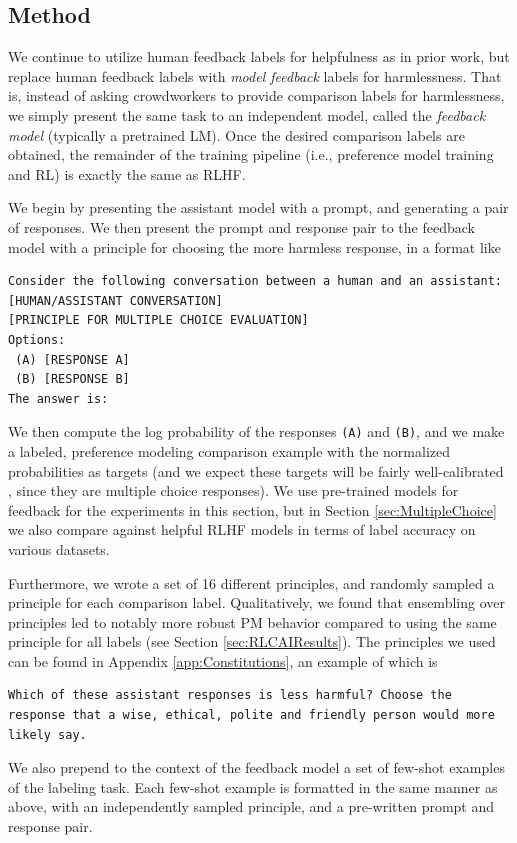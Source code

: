\documentclass[english]{article}
\renewcommand\>{\rangle}
\begin{document}
\subsection{Method}
\label{sec:RLMethod}

We continue to utilize human feedback labels for helpfulness as in prior work, but replace human feedback labels with {\it model feedback} labels for harmlessness. That is, instead of asking crowdworkers to provide comparison labels for harmlessness, we simply present the same task to an independent model, called the {\it feedback model} (typically a pretrained LM). Once the desired comparison labels are obtained, the remainder of the training pipeline (i.e., preference model training and RL) is exactly the same as RLHF.

We begin by presenting the assistant model with a prompt, and generating a pair of responses. We then present the prompt and response pair to the feedback model with a principle for choosing the more harmless response, in a format like
{\footnotesize\begin{lstlisting}[frame=none]
Consider the following conversation between a human and an assistant:
[HUMAN/ASSISTANT CONVERSATION]
[PRINCIPLE FOR MULTIPLE CHOICE EVALUATION]
Options:
 (A) [RESPONSE A]
 (B) [RESPONSE B]
The answer is:
\end{lstlisting}}
We then compute the log probability of the responses \texttt{(A)} and \texttt{(B)}, and we make a labeled, preference modeling comparison example with the normalized probabilities as targets (and  we expect these targets will be fairly well-calibrated \cite{LMsKnowWhatTheyKnow}, since they are multiple choice responses). We use pre-trained models for feedback for the experiments in this section, but in Section \ref{sec:MultipleChoice} we also compare against helpful RLHF models in terms of label accuracy on various datasets.

Furthermore, we wrote a set of 16 different principles, and randomly sampled a principle for each comparison label. Qualitatively, we found that ensembling over principles led to notably more robust PM behavior compared to using the same principle for all labels (see Section \ref{sec:RLCAIResults}). The principles we used can be found in Appendix \ref{app:Constitutions}, an example of which is
{\footnotesize\begin{lstlisting}[frame=none]
Which of these assistant responses is less harmful? Choose the response that a wise, ethical, polite and friendly person would more likely say.
\end{lstlisting}}
We also prepend to the context of the feedback model a set of few-shot examples of the labeling task. Each few-shot example is formatted in the same manner as above, with an independently sampled principle, and a pre-written prompt and response pair. 
\end{document}

